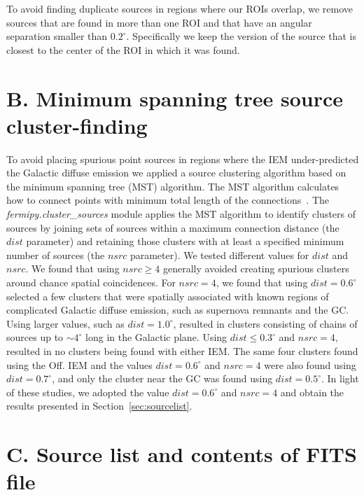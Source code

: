 \documentclass[iop]{emulateapj}
\begin{document}
To avoid finding duplicate sources in regions where our ROIs overlap, 
we remove sources that are found in more than one ROI and 
that have an angular separation smaller than $0.2^{\circ}$.  Specifically 
we keep the version of the source that is closest to the center
of the ROI in which it was found.



\section{B. Minimum spanning tree source cluster-finding}
\label{sec:mst}

To avoid placing spurious point sources in regions where the IEM
under-predicted the Galactic diffuse emission we applied a source
clustering algorithm based on the minimum spanning tree (MST)
algorithm.  The MST algorithm calculates how to connect points with
minimum total length of the connections~\citep{10.2307/2033241}.  The
{\it fermipy.cluster\_sources} module applies the MST algorithm to
identify clusters of sources by joining sets of sources within a
maximum connection distance (the $dist$ parameter) and retaining those
clusters with at least a specified minimum number of sources (the
$nsrc$ parameter). We tested different values for $dist$ and $nsrc$.
We found that using $nsrc\ge4$ generally avoided creating spurious
clusters around chance spatial coincidences.  For $nsrc=4$, we
found that using $dist=0.6^{\circ}$ selected a few clusters that were
spatially associated with known regions of complicated Galactic
diffuse emission, such as supernova remnants and the GC.  Using larger
values, such as $dist=1.0^{\circ}$, resulted in clusters consisting of
chains of sources up to $\sim 4^{\circ}$ long in the Galactic plane.
Using $dist\le0.3^{\circ}$ and $nsrc=4$, resulted in no clusters being
found with either IEM.  The same four clusters found using the Off. IEM
and the values $dist=0.6^{\circ}$ and $nsrc=4$ were also found using 
$dist=0.7^{\circ}$, and only the cluster near the GC was found using    
$dist=0.5^{\circ}$.  In light of these studies, we adopted the value
$dist=0.6^{\circ}$ and $nsrc=4$ and obtain the results presented in 
Section~\ref{sec:sourcelist}.




\section{C. Source list and contents of FITS file}
\label{sec:app2fig}
\end{document}
